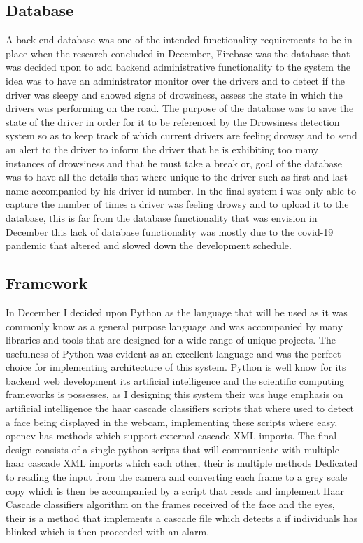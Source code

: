\subsection{Database}
A back end database was one of the intended functionality requirements to be in place when the research concluded in December, Firebase  was the database that was decided upon to add backend administrative functionality to the system the idea was to have an administrator monitor over the drivers and to detect if the driver was sleepy and showed signs of drowsiness, assess the state in which the drivers was performing on the road.  The purpose of the database was to save the state of the driver in order for it to be referenced by the Drowsiness detection system so as to keep track of which current drivers are feeling drowsy and to send an alert to the driver to inform the driver that he is exhibiting too many instances of drowsiness and that he must take a break or, goal of the database was to have all the details that where unique to the driver  such as first and last name accompanied by his driver id number. In the final system i was only able to capture the number of times a driver was feeling drowsy and to upload it to the database, this is far from the database functionality that was envision in December this lack of database functionality was mostly due to the covid-19 pandemic that altered and slowed down the development schedule.

\subsection{Framework}
In December I decided upon Python as the language that will be used as it was commonly know as a general purpose language and was accompanied by many libraries and tools that are designed for a wide range of unique projects. The usefulness of Python was evident as an excellent language and was the perfect choice for implementing  architecture of this system. Python is well know for its  backend web development its artificial intelligence and the scientific computing frameworks is possesses, as I designing this system their was huge emphasis on artificial intelligence the haar cascade classifiers scripts that where used to detect a face being displayed in the webcam,  implementing  these scripts where easy, opencv has methods which support external cascade XML imports.  The final design consists of  a single python scripts that will communicate  with multiple haar cascade XML imports which each other, their is  multiple methods Dedicated to reading the input from the camera and converting each frame to a grey scale copy which is then be accompanied by a script that reads and implement Haar Cascade classifiers algorithm on the frames received of the face and the eyes, their is a method that implements a cascade file which detects a if individuals has blinked which is then proceeded with an alarm. 

